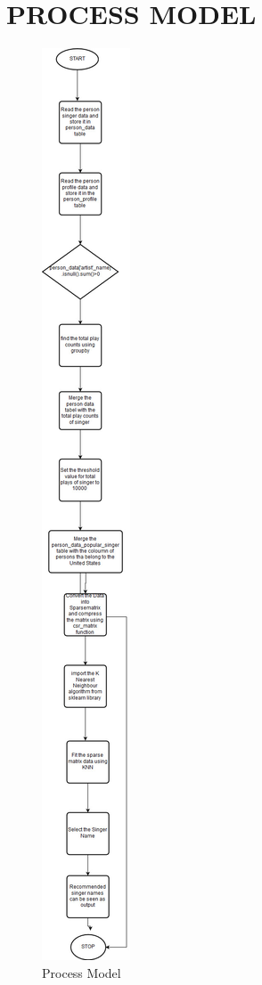 \documentclass[paper=a4, fontsize=11pt]{scrartcl}
\numberwithin{equation}{section}		%
\numberwithin{figure}{section}			%
\numberwithin{table}{section}				%
\begin{document}
\section{PROCESS MODEL}
\begin{figure}[H]

\begin{center}

\includegraphics[scale=.3]{process_model.jpg}

 \end{center}

  \caption{Process Model}

  \label{fig:}

\end{figure}
\end{document}
